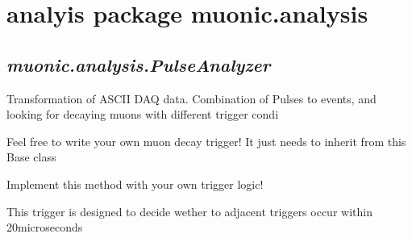 \documentclass[letterpaper,10pt,english]{sphinxmanual}
\begin{document}
\section{analyis package muonic.analysis}
\label{muonic:module-muonic.analysis}\label{muonic:analyis-package-muonic-analysis}

\subsection{\emph{muonic.analysis.PulseAnalyzer}}
\label{muonic:muonic-analysis-pulseanalyzer}
Transformation of ASCII DAQ data. Combination of Pulses to events, and looking for decaying muons with different trigger condi
\label{muonic:module-muonic.analysis.PulseAnalyzer}

\begin{fulllineitems}
\label{muonic:muonic.analysis.PulseAnalyzer.DecayTriggerBase}
Feel free to write your own muon decay trigger! It just needs to inherit from this 
Base class

\begin{fulllineitems}
\label{muonic:muonic.analysis.PulseAnalyzer.DecayTriggerBase.trigger}
Implement this method with your own trigger logic!

\end{fulllineitems}


\end{fulllineitems}


\begin{fulllineitems}
\label{muonic:muonic.analysis.PulseAnalyzer.DecayTriggerSimple}
This trigger is designed to decide wether to adjacent triggers
occur within 20microseconds

\begin{fulllineitems}
\label{muonic:muonic.analysis.PulseAnalyzer.DecayTriggerSimple.trigger}
\end{fulllineitems}


\end{fulllineitems}
\end{document}
